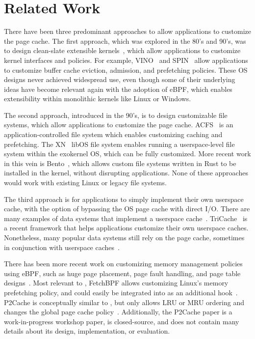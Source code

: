 \section{Related Work}
\label{sec:related}






There have been three predominant approaches to allow applications to customize the page cache. 
The first approach, which was explored in the 80's and 90's, was to design clean-slate extensible kernels~\cite{SPIN,VINO,exokernel-original,mach}, which allow applications to customize kernel interfaces and policies. For example, VINO~\cite{VINO,VINO-2} and SPIN~\cite{SPIN} %
allow applications to customize buffer cache eviction, admission, and prefetching policies. These OS designs never achieved widespread use, even though some of their underlying ideas have become relevant again with the adoption of eBPF, which enables extensibility within monolithic kernels like Linux or Windows.

The second approach, introduced in the 90's, is to design customizable file systems, which allow applications to customize the page cache. ACFS~\cite{kai-li-caching,kai-li-caching2} is an application-controlled file system which enables customizing caching and prefetching. The XN~\cite{exokernel} libOS file system enables running a userspace-level file system within the exokernel OS, which can be fully customized. More recent work in this vein is Bento~\cite{bento}, which allows custom file systems written in Rust to be installed in the kernel, without disrupting applications. None of these approaches would work with existing Linux or legacy file systems. %

The third approach is for applications to simply implement their own userspace cache, with the option of bypassing the OS page cache with direct I/O. There are many examples of data systems that implement a userspace cache~\cite{rocksdb,wisckey,splinterdb}. TriCache~\cite{tricache} is a recent framework that helps applications customize their own userspace caches. Nonetheless, many popular data systems still rely on the page cache, sometimes in conjunction with userspace caches~\cite{rocksdb,postgres,wiredtiger,symbiosis,combining-caches}. %

There has been more recent work on customizing memory management policies using eBPF, such as huge page placement, page fault handling, and page table designs~\cite{prog-mem-bpf,custom-page-fault,ebpf-mm}. Most relevant to \name, FetchBPF allows customizing Linux's memory prefetching policy, and could easily be integrated into \name as an additional hook~\cite{fetchbpf}. P2Cache is conceptually similar to \name, but only allows LRU or MRU ordering and changes the global page cache policy~\cite{P2Cache}. Additionally, the P2Cache paper is a work-in-progress workshop paper, is closed-source, and does not contain many details about its design, implementation, or evaluation.